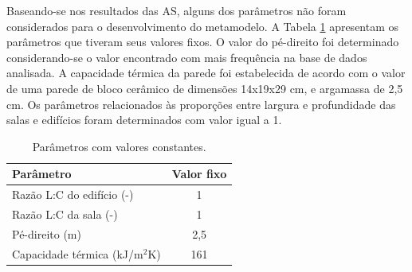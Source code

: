 \documentclass[brazil,hardcopy,openany,a4paper]{ufscthesis}
\begin{document}
	Baseando-se nos resultados das AS, alguns dos parâmetros não foram considerados para o desenvolvimento do metamodelo. A Tabela \ref{table:param_fixed} apresentam os parâmetros que tiveram seus valores fixos. O valor do pé-direito foi determinado considerando-se o valor encontrado com mais frequência na base de dados analisada. A capacidade térmica da parede foi estabelecida de acordo com o valor de uma parede de bloco cerâmico de dimensões 14x19x29 cm, e argamassa de 2,5 cm. Os parâmetros relacionados às proporções entre largura e profundidade das salas e edifícios foram determinados com valor igual a 1. 
	
	\begin{table}[H]		
		\centering
		\caption{Parâmetros com valores constantes.}
		\label{table:param_fixed}
		\begin{tabular}{|l |c |}
			\hline
			\textbf{Parâmetro} & Valor fixo \\
			\hline
			Razão L:C do edifício (-) & 1 \\
			\hline
			Razão L:C da sala (-) & 1 \\
			\hline
			Pé-direito (m) & 2,5 \\
			\hline
			Capacidade térmica (kJ/m$^2$K) & 161 \\
			\hline
		\end{tabular}
	\end{table}
	
\end{document}
